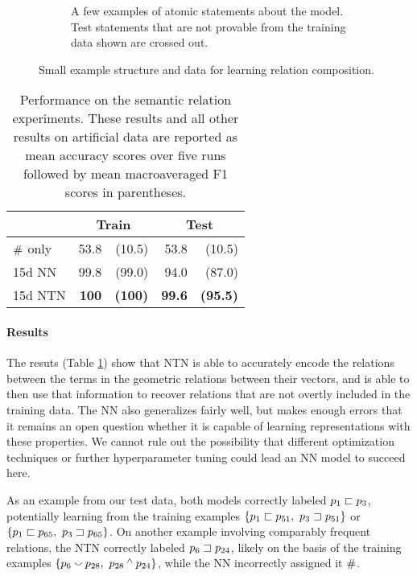 \begin{figure}[t]
\begin{subfigure}[t]{0.43\textwidth}
\begin{tabular}[b]{c  c}
      \bottomrule
    \end{tabular}

    \caption{A few examples of atomic statements about the
      model.  Test statements that are not provable from the training data shown are
      crossed out.}
  \end{subfigure}  
  \caption{Small example structure and data for learning relation composition.}
  \label{lattice-figure}
\end{figure} 

\begin{table}[tp]
  \centering\small
  \begin{tabular}{ l r@{ \ }r r@{ \ }r }
    \toprule
    ~&\multicolumn{2}{c}{Train} & \multicolumn{2}{c}{Test}\\
    \midrule
    $\mathbin{\#}$ only &53.8 &(10.5)    &53.8 &(10.5) \\
    15d NN &				99.8&	(99.0) &94.0&(87.0) \\
    15d NTN 				& \textbf{100} & \textbf{(100)} & \textbf{99.6} & \textbf{(95.5)}\\
    \bottomrule
  \end{tabular}
  
  
  \caption{Performance on the semantic relation experiments. These results and all other results on artificial data are reported as mean accuracy scores over five runs followed by mean macroaveraged F1 scores in parentheses.}
  \label{joinresultstable}
\end{table}

\paragraph{Results} 
The resuts (Table \ref{joinresultstable}) show that NTN is able to accurately encode the relations between the terms in the geometric relations between their vectors, 
and is able to then use that information to recover relations that 
are not overtly included in the training data. The NN also generalizes fairly well, 
but makes enough errors that it remains an open question whether 
it is capable of learning representations with these properties. 
We cannot rule out the possibility that different optimization techniques or
further hyperparameter tuning could lead an NN model to succeed here.

As an example from our test data, both models correctly labeled $p_1 \sqsubset p_3$, potentially learning from the training examples $\{p_1 \sqsubset p_{51},~p_3 \sqsupset p_{51}\}$ or $\{p_1\sqsubset p_{65},~p_3 \sqsupset p_{65} \}$. On another example involving comparably frequent relations, the NTN correctly labeled $p_6 \sqsupset p_{24}$, likely on the basis of the training examples $\{p_6 \mathbin{\smallsmile} p_{28},~p_{28} \mathbin{^{\wedge}} p_{24}\}$, while the NN incorrectly assigned it $\mathbin{\#}$.

